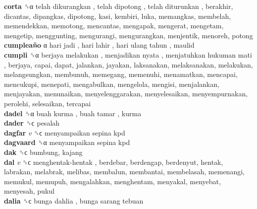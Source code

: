 \textbf{corta} ␝α   telah dikurangkan ,  telah dipotong ,  telah diturunkan , berakhir, dicantas, dipangkas, dipotong, kasi, kembiri, luka, memangkas, membelah, memendekkan, memotong, mencantas, mengapak, mengerat, mengetam, mengetip, menggunting, mengurangi, mengurangkan, menjentik, menoreh, potong  \\
\textbf{cumpleaño} α   hari jadi ,  hari lahir ,  hari ulang tahun , maulid  \\
\textbf{cumpli} ␝α   berjaya melakukan ,  menjadikan nyata ,  menjatuhkan hukuman mati , berjaya, capai, dapat, jalankan, jayakan, laksanakan, melaksanakan, melakukan, melangsungkan, membunuh, memegang, memenuhi, menamatkan, mencapai, mencukupi, menepati, mengabulkan, mengelola, mengisi, menjalankan, menjayakan, menunaikan, menyelenggarakan, menyelesaikan, menyempurnakan, perolehi, selesaikan, tercapai  \\
\textbf{dadel} ␝α   buah kurma ,  buah tamar , kurma  \\
\textbf{dader} ␝ϲ  pesalah  \\
\textbf{dagfar} \emph{v}  ␝ϲ   menyampaikan sepina kpd   \\
\textbf{dagvaard} ␝α   menyampaikan sepina kpd   \\
\textbf{dak} ␝ϲ  bumbung, kajang  \\
\textbf{dal} \emph{v}  ␝ϲ   menghentak-hentak , berdebar, berdengap, berdenyut, hentak, labrakan, melabrak, melibas, membalun, membantai, membelasah, memenangi, memukul, memupuh, mengalahkan, menghentam, menyakal, menyebat, menyesah, pukul  \\
\textbf{dalia} ␝ϲ   bunga dahlia ,  bunga sarang tebuan   \\
